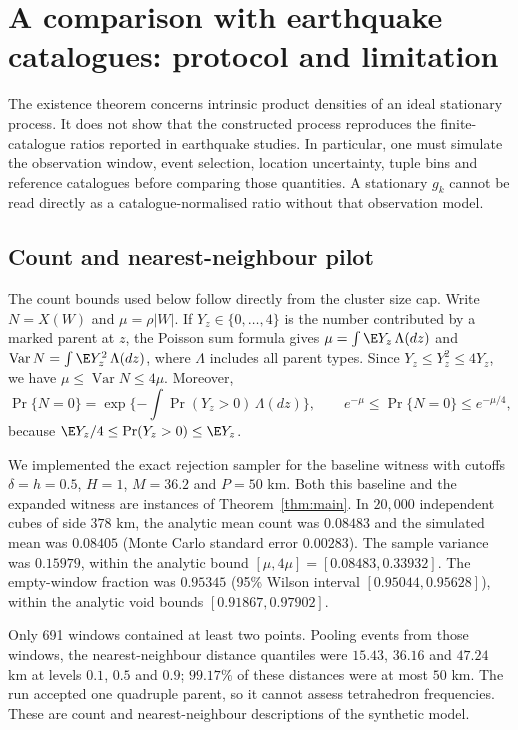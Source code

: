 \section{A comparison with earthquake catalogues: protocol and limitation}
\label{sec:protocol}

The existence theorem concerns intrinsic product densities of an ideal stationary process. It does not show that the constructed process reproduces the finite-catalogue ratios reported in earthquake studies. In particular, one must simulate the observation window, event selection, location uncertainty, tuple bins and reference catalogues before comparing those quantities. A stationary $g_k$ cannot be read directly as a catalogue-normalised ratio without that observation model.

\subsection{Count and nearest-neighbour pilot}

The count bounds used below follow directly from the cluster size cap. Write $N=X(W)$ and $\mu=\rho|W|$. If $Y_z\in\{0,\ldots,4\}$ is the number contributed by a marked parent at $z$, the Poisson sum formula gives $\mu=\int\E Y_z\,\Lambda(dz)$ and $\operatorname{Var}N=\int\E Y_z^2\,\Lambda(dz)$, where $\Lambda$ includes all parent types. Since $Y_z\leq Y_z^2\leq4Y_z$, we have $\mu\leq\operatorname{Var}N\leq4\mu$. Moreover,
\[
 \Pr\{N=0\}=\exp\{-\int\Pr(Y_z>0)\,\Lambda(dz)\},\qquad
 e^{-\mu}\leq\Pr\{N=0\}\leq e^{-\mu/4},
\]
because $\E Y_z/4\leq\Pr(Y_z>0)\leq\E Y_z$.


We implemented the exact rejection sampler for the baseline witness with cutoffs $\delta=h=0.5$, $H=1$, $M=36.2$ and $P=50$ km. Both this baseline and the expanded witness are instances of Theorem~\ref{thm:main}. In $20{,}000$ independent cubes of side $378$ km, the analytic mean count was $0.08483$ and the simulated mean was $0.08405$ (Monte Carlo standard error $0.00283$). The sample variance was $0.15979$, within the analytic bound $[\mu,4\mu]=[0.08483,0.33932]$. The empty-window fraction was $0.95345$ (95\% Wilson interval $[0.95044,0.95628]$), within the analytic void bounds $[0.91867,0.97902]$.

Only 691 windows contained at least two points. Pooling events from those windows, the nearest-neighbour distance quantiles were $15.43$, $36.16$ and $47.24$ km at levels $0.1$, $0.5$ and $0.9$; $99.17\%$ of these distances were at most $50$ km. The run accepted one quadruple parent, so it cannot assess tetrahedron frequencies. These are count and nearest-neighbour descriptions of the synthetic model.

